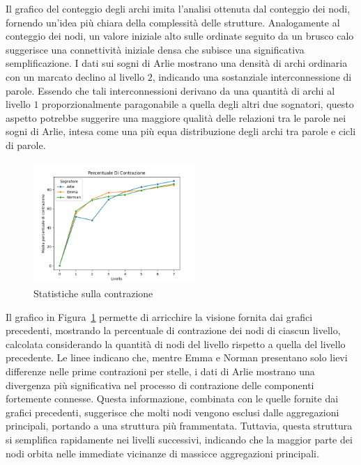 Il grafico del conteggio degli archi imita l'analisi ottenuta dal conteggio dei nodi, fornendo un'idea più chiara
della complessità delle strutture.
Analogamente al conteggio dei nodi, un valore iniziale alto sulle ordinate seguito da un brusco calo suggerisce
una connettività iniziale densa che subisce una significativa semplificazione.
I dati sui sogni di Arlie mostrano una densità di archi ordinaria con un marcato declino al livello $2$, indicando una
sostanziale interconnessione di parole.
Essendo che tali interconnessioni derivano da una quantità di archi al livello $1$ proporzionalmente
paragonabile a quella degli altri due sognatori, questo aspetto potrebbe suggerire una maggiore qualità delle relazioni
tra le parole nei sogni di Arlie, intesa come una più equa distribuzione degli archi tra parole e cicli di parole.

\begin{figure}
   \vspace{-5pt}
    \includegraphics[width=0.55\textwidth]{Immagini/percentuale_di_contrazione}
    \caption{Statistiche sulla contrazione}\label{fig:contraction_percentage}
   \vspace{-5pt}
\end{figure}

Il grafico in Figura~\ref{fig:contraction_percentage} permette di arricchire la visione fornita dai grafici precedenti,
mostrando la percentuale di contrazione dei nodi di ciascun livello, calcolata considerando la quantità di nodi del
livello rispetto a quella del livello precedente.
Le linee indicano che, mentre Emma e Norman presentano solo lievi differenze nelle prime contrazioni per stelle, i dati
di Arlie mostrano una divergenza più significativa nel processo di contrazione delle componenti fortemente connesse.
Questa informazione, combinata con le quelle fornite dai grafici precedenti, suggerisce che molti nodi vengono esclusi
dalle aggregazioni principali, portando a una struttura più frammentata.
Tuttavia, questa struttura si semplifica rapidamente nei livelli successivi, indicando che la maggior parte dei nodi
orbita nelle immediate vicinanze di massicce aggregazioni principali.

